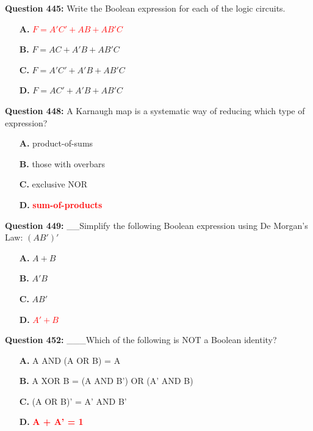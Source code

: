\documentclass[12pt,a4paper]{article}
\begin{document}
\vspace{0.5cm}

\textbf{Question 445:} Write the Boolean expression for each of the logic circuits.

\begin{itemize}
    \item[\textbf{A.}] \textcolor{red}{\textbf{$F = A'C' + AB + AB'C$}}
    \item[\textbf{B.}] $F = AC + A'B + AB'C$
    \item[\textbf{C.}] $F = A'C' + A'B + AB'C$
    \item[\textbf{D.}] $F = AC' + A'B + AB'C$
\end{itemize}

\vspace{0.5cm}

\textbf{Question 448:} A Karnaugh map is a systematic way of reducing which type of expression?

\begin{itemize}
    \item[\textbf{A.}] product-of-sums
    \item[\textbf{B.}] those with overbars
    \item[\textbf{C.}] exclusive NOR
    \item[\textbf{D.}] \textcolor{red}{\textbf{sum-of-products}}
\end{itemize}

\vspace{0.5cm}

\textbf{Question 449:} __Simplify the following Boolean expression using De Morgan's Law: $(AB')'$

\begin{itemize}
    \item[\textbf{A.}] $A + B$
    \item[\textbf{B.}] $A'B$
    \item[\textbf{C.}] $AB'$
    \item[\textbf{D.}] \textcolor{red}{\textbf{$A' + B$}}
\end{itemize}

\vspace{0.5cm}

\textbf{Question 452:} ___Which of the following is NOT a Boolean identity?

\begin{itemize}
    \item[\textbf{A.}] A AND (A OR B) = A
    \item[\textbf{B.}] A XOR B = (A AND B') OR (A' AND B)
    \item[\textbf{C.}] (A OR B)' = A' AND B'
    \item[\textbf{D.}] \textcolor{red}{\textbf{A + A' = 1}}
\end{itemize}
\end{document}
